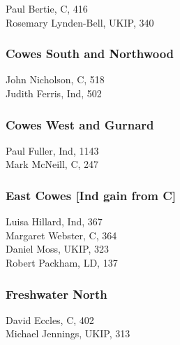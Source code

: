 \documentclass[a4paper,openany,10pt]{book}
\begin{document}


Paul Bertie, C, 416\\
Rosemary Lynden-Bell, UKIP, 340\\


\subsubsection*{Cowes South and Northwood}



John Nicholson, C, 518\\
Judith Ferris, Ind, 502\\


\subsubsection*{Cowes West and Gurnard}



Paul Fuller, Ind, 1143\\
Mark McNeill, C, 247\\


\subsubsection*{East Cowes \hspace*{\fill}\nolinebreak[1]%
\enspace\hspace*{\fill}
[Ind gain from C]}



Luisa Hillard, Ind, 367\\
Margaret Webster, C, 364\\
Daniel Moss, UKIP, 323\\
Robert Packham, LD, 137\\


\subsubsection*{Freshwater North}



David Eccles, C, 402\\
Michael Jennings, UKIP, 313\\
\end{document}

